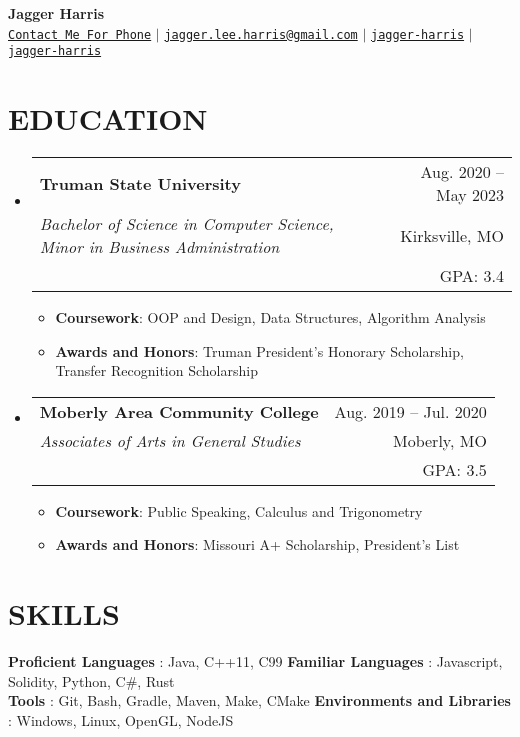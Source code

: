 \documentclass[letterpaper,11pt]{article}
\makeatletter
\newcommand{\resumeItem}[1]{
  \item\small{
    {#1 \vspace{-1pt}}
  }
}
\newcommand{\resumeSubheading}[5]{
  \vspace{-1pt}\item
    \begin{tabular*}{\textwidth}[t]{l@{\extracolsep{\fill}}r}
      \textbf{#1} & {\color{dark-grey}\small #2}\vspace{1pt}\\ %
      \textit{#3} & {\color{dark-grey} \small #4}\vspace{1pt}\\ %
      & \color{dark-grey} \small #5
    \end{tabular*}\vspace{-20pt}
}
\newcommand{\resumeSubHeadingListStart}{\begin{itemize}[leftmargin=0in, label={}]}
\newcommand{\resumeSubHeadingListEnd}{\end{itemize}}
\newcommand{\resumeItemListStart}{\begin{itemize}\setlength{\itemindent}{-1em}}
\newcommand{\resumeItemListEnd}{\end{itemize}\vspace{0pt}}
\makeatother
\begin{document}
\begin{center}
	\textbf{\Huge Jagger Harris} \\ \vspace{5pt}
  \small \faPhone* \texttt{\href{tel:+1555-555-5555}{Contact Me For Phone}} \hspace{1pt} $|$
	\hspace{1pt} \faEnvelope \hspace{2pt} \texttt{\href{mailto:jagger.lee.harris@gmail.com}{jagger.lee.harris@gmail.com}} \hspace{1pt} $|$
	\hspace{1pt} \faGithub \hspace{2pt} \texttt{\href{https://github.com/jagger-harris}{jagger-harris}} \hspace{1pt} $|$
	\hspace{1pt} \faLinkedin \hspace{2pt} \texttt{\href{https://www.linkedin.com/in/jagger-harris/}{jagger-harris}} \hspace{1pt}
	\\ \vspace{-3pt}
\end{center}

\section{EDUCATION}
\resumeSubHeadingListStart

\resumeSubheading
{Truman State University}{Aug. 2020 -- May 2023}
{Bachelor of Science in Computer Science, Minor in Business Administration}{Kirksville, MO}
{GPA: 3.4}
\resumeItemListStart
\resumeItem {\textbf{Coursework}: OOP and Design, Data Structures, Algorithm Analysis}
\resumeItem
{\textbf{Awards and Honors}: Truman President's Honorary Scholarship, Transfer Recognition Scholarship}
\resumeItemListEnd

\resumeSubheading
{Moberly Area Community College}{Aug. 2019 -- Jul. 2020}
{Associates of Arts in General Studies}{Moberly, MO}
{GPA: 3.5}
\resumeItemListStart
\resumeItem {\textbf{Coursework}: Public Speaking, Calculus and Trigonometry}
\resumeItem
{\textbf{Awards and Honors}: Missouri A+ Scholarship, President's List}
\resumeItemListEnd
\resumeSubHeadingListEnd

\section{SKILLS}
\begin{itemize}[leftmargin=0in, label={}]
	\small{\item{
		\textbf{Proficient Languages} {: Java, C++11, C99}\vspace{2pt}
		\hfill
		\textbf{Familiar Languages} {: Javascript, Solidity, Python, C\#, Rust}\vspace{2pt} \\
		\textbf{Tools}     {: Git, Bash, Gradle, Maven, Make, CMake}
    \hfill
    \textbf{Environments and Libraries}     {: Windows, Linux, OpenGL, NodeJS}
	}}
\end{itemize}
\end{document}
